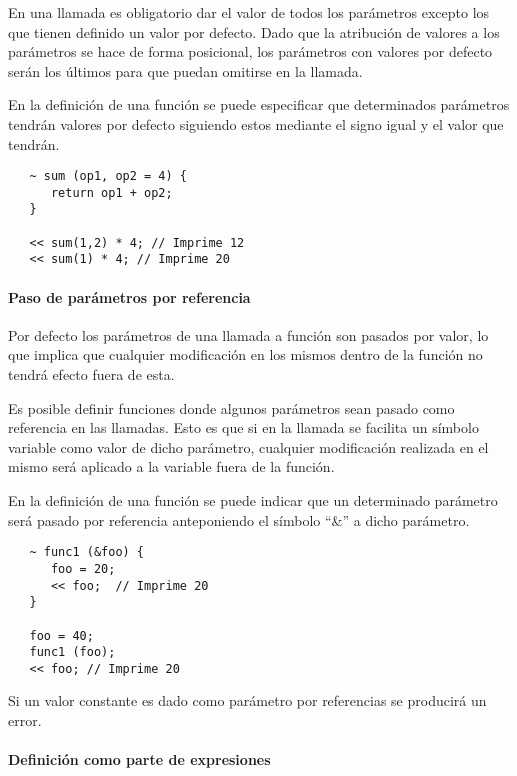 En una llamada es obligatorio dar el valor de todos los parámetros excepto los que tienen definido un valor por defecto. Dado que la 
atribución de valores a los parámetros se hace de forma posicional, los parámetros con valores por defecto serán los últimos
para que puedan omitirse en la llamada. 

En la definición de una función se puede especificar que determinados parámetros tendrán valores por defecto siguiendo estos mediante el 
signo igual y el valor que tendrán. \\


\begin{lstlisting}
   ~ sum (op1, op2 = 4) { 
      return op1 + op2;
   }
   
   << sum(1,2) * 4; // Imprime 12
   << sum(1) * 4; // Imprime 20
\end{lstlisting} 

\paragraph{Paso de parámetros por referencia} \label{sec:func_ref}
Por defecto los parámetros de una llamada a función son pasados por valor, lo que implica que cualquier modificación 
en los mismos dentro de la función no tendrá efecto fuera de esta. 

Es posible definir funciones donde algunos parámetros sean pasado como referencia en las llamadas. Esto es que si
en la llamada se facilita un símbolo variable como valor de dicho parámetro, cualquier modificación realizada 
en el mismo será aplicado a la variable fuera de la función. 

En la definición de una función se puede indicar que un determinado parámetro será pasado por referencia anteponiendo
el símbolo ``\&'' a dicho parámetro. \\

\begin{lstlisting}
   ~ func1 (&foo) { 
      foo = 20;
      << foo;  // Imprime 20
   }
   
   foo = 40;
   func1 (foo);
   << foo; // Imprime 20
\end{lstlisting}

Si un valor constante es dado como parámetro por referencias se producirá un error.

\paragraph{Definición como parte de expresiones}

